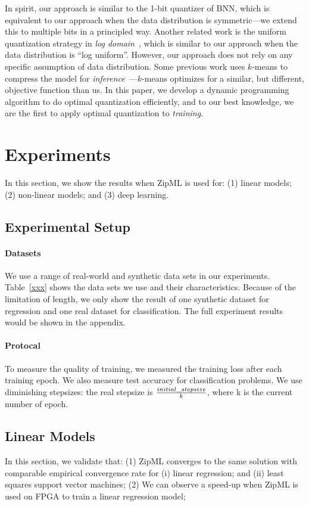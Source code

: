 \documentclass{article}
\begin{document}
In spirit, our approach is similar to the 1-bit quantizer of
BNN, which is equivalent to our approach when the data
distribution is symmetric---we extend this
to multiple bits in a principled way. Another related work
is the uniform quantization strategy 
in {\em log domain}~\cite{miyashita2016convolutional},
which is similar to our approach when the data distribution
is ``log uniform''. However, our approach does not rely on
any specific assumption of data distribution.
Some previous work uses $k$-means to
compress the model for {\em inference}~\cite{XXX}---$k$-means
optimizes for a similar, but different, objective
function than us. In this paper, we 
develop a dynamic
programming algorithm to do optimal quantization efficiently,
and to our best knowledge, we
are the first to apply optimal quantization to
{\em training}.




\section{Experiments} \label{sec:exp}

In this section, we show the results when
ZipML is used for: (1) linear models; (2) non-linear models;
and (3) deep learning.
\subsection{Experimental Setup}

\paragraph{Datasets} 
We use a range of real-world
and synthetic data sets in our experiments. Table~\ref{xxx} shows the data sets we use and their characteristics.
Because of the limitation of length, we only show the result of one synthetic dataset for regression and one real dataset for classification. The full experiment results would be shown in the appendix.
\paragraph{Protocal} To measure the quality of training,
we measured the training loss after each training epoch. We also measure test accuracy for classification problems. We use diminishing stepsizes: the real stepsize is ${initial\_stepsize\over k}$, where k is the current number of epoch.

\subsection{Linear Models}
In this section, we validate that: (1) ZipML 
converges to the same solution with comparable
empirical convergence rate for (i) linear regression;
and (ii) least squares support vector machines;
(2) We can observe a speed-up when ZipML is used on FPGA to train a linear regression model;
\end{document}
